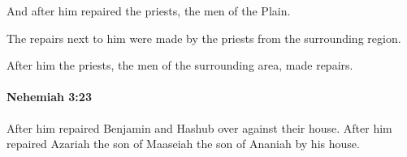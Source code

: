 			\begin{versebox}
					\item[BHS] 
					\item[LXX] 
					\item[ASV] And after him repaired the priests, the men of the Plain.
					\item[NIV] The repairs next to him were made by the priests from the surrounding region.
					\item[NRSV] After him the priests, the men of the surrounding area, made repairs.
			\end{versebox}

		\paragraph{Nehemiah 3:23} %
			\label{NEHEMIAH-3-23}

			After him repaired Benjamin and Hashub over against their house. After him repaired Azariah the son of Maaseiah the son of Ananiah by his house.

